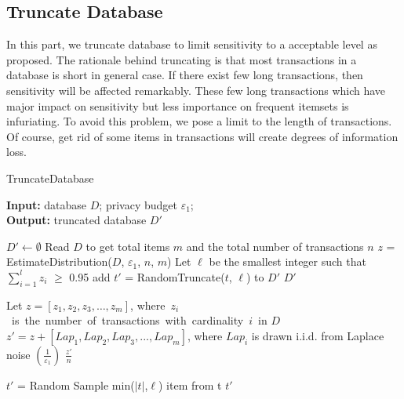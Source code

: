 \documentclass[conference]{IEEEtran}
\begin{document}
\subsection{Truncate Database}
In this part, we truncate database to limit sensitivity to a acceptable level as \cite{b6} proposed.
The rationale behind truncating is that most transactions in a database is short in general case.
If there exist few long transactions, then sensitivity will be affected remarkably.
These few long transactions which have major impact on sensitivity but less importance on frequent itemsets is infuriating.
To avoid this problem, we pose a limit to the length of transactions. 
Of course, get rid of some items in transactions will create degrees of information loss.
\begin{algorithm}[htbp]
    \caption{TruncateDatabase} 
    \hspace*{0.02in} {\bf Input:} 
    database $D$; privacy budget $\varepsilon_1$;\\
    \hspace*{0.02in} {\bf Output:} %
    truncated database $D'$
    
    \begin{algorithmic}[1]
    \State $D'\leftarrow \emptyset$
    \State Read $D$ to get total items $m$ and the total number of transactions $n$
    \State $z$ = {EstimateDistribution}{($D$, $\varepsilon_1$, $n$, $m$)}
    \State Let $\ell$ be the smallest integer such that  $\sum_{i=1}^l$$z_i$ $\ge$ 0.95
        \State add $t'$ = RandomTruncate($t$, $\ell$) to $D'$
    \EndFor 
    \State \Return $D'$
    
    \State Let $z = [ z_1, z_2, z_3,\dots,z_m]$, 
    where\ $z_i$\ is\ the\ number\ of\ transactions\ with\ cardinality\ $i$\ in $D$
    \State $z' = z + [Lap_1,Lap_2,Lap_3,...,Lap_m]$, where $Lap_i$ is drawn i.i.d. from Laplace noise $(\frac{1}{\varepsilon_1})$    
    \State \Return $\frac{z'}{n}$
    \EndFunction

    \State $t'$ = Random Sample min({$|t|$,$\ell$}) item from t
    \State \Return $t'$
    \EndFunction 
    \end{algorithmic}
    \label{alg1}
\end{algorithm}
\end{document}
